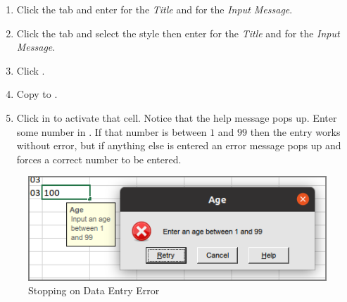 \begin{enumerate}[resume]	
	\item Click the  tab and enter  for the \textit{Title} and  for the \textit{Input Message}.
	\item Click the  tab and select the  style then enter  for the \textit{Title} and  for the \textit{Input Message}.
	\item Click .
	\item Copy  to .
	\item Click in  to activate that cell. Notice that the help message pops up. Enter some number in . If that number is between $ 1 $ and $ 99 $ then the entry works without error, but if anything else is entered an error message pops up and forces a correct number to be entered.
\end{enumerate}

\begin{figure}[H]
	\centering
	\includegraphics[width=\maxwidth{.95\linewidth}]{gfx/ch07_fig40}
	\caption{Stopping on Data Entry Error}
	\label{07:fig40}
\end{figure}

